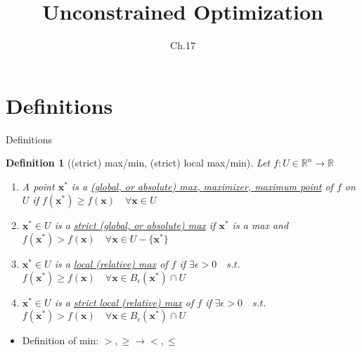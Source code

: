 \documentclass[final]{beamer}
\author[조남운]{\mail}
\title{Unconstrained Optimization}
\subtitle{Ch.17}
\newtheorem{defn}{Definition}
\newcommand{\bb}{\mathbb}
\newcommand{\bd}{\mathbf}
\begin{document}
\maketitle


\section{Definitions} %
\label{sec:definitions}
\begin{frame}[t]{Definitions}
	\begin{defn}
		[(strict) max/min, (strict) local max/min]
		Let $f:U\in \bb{R}^n\rightarrow \bb{R}$
		\begin{enumerate}
			\item A point $\bd{x}^\ast$ is a \uline{(global, or absolute) max, maximizer, maximum point} of $f$ on $U$ if $f(\bd{x^\ast})\ge f(\bd{x})\quad\forall \bd{x}\in U$
			\item $\bd{x^\ast}\in U$ is a \uline{strict (global, or absolute) max} if $\bd{x^\ast}$ is a max and $f(\bd{x^\ast})>f(\bd{x})\quad\forall \bd{x}\in U-\{\bd{x^\ast}\}$
			\item $\bd{x^\ast}\in U$ is a \uline{local (relative) max} of $f$ if $\exists \epsilon>0 \quad s.t.$ $f(\bd{x^\ast})\ge f(\bd{x})\quad\forall \bd{x}\in B_\epsilon(\bd{x^\ast})\cap U$
			\item $\bd{x^\ast}\in U$ is a \uline{strict local (relative) max} of $f$ if $\exists \epsilon>0 \quad s.t.$ $f(\bd{x^\ast})> f(\bd{x})\quad\forall \bd{x}\in B_\epsilon(\bd{x^\ast})\cap U$
		\end{enumerate}
	\end{defn}
	\begin{itemize}
		\item Definition of min: $>,\ge \rightarrow <, \le$
	\end{itemize}
\end{frame}
\end{document}
